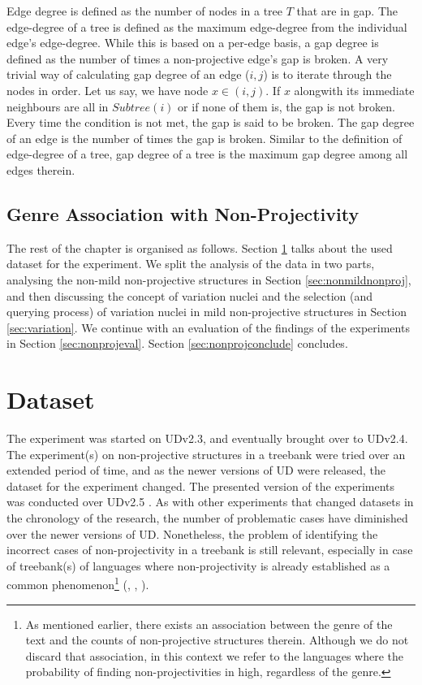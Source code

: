 Edge degree is defined as the number of nodes in a tree \(T\) that are in gap. The edge-degree of a tree is defined as the maximum edge-degree from the individual edge's edge-degree. While this is based on a per-edge basis, a gap degree is defined as the number of times a non-projective edge's gap is broken. A very trivial way of calculating gap degree of an edge (\(i, j\)) is to iterate through the nodes in order. Let us say, we have node \(x \in (i, j)\). If \(x\) alongwith its immediate neighbours are all in \(Subtree(i)\) or if none of them is, the gap is not broken. Every time the condition is not met, the gap is said to be broken. The gap degree of an edge is the number of times the gap is broken. Similar to the definition of edge-degree of a tree, gap degree of a tree is the maximum gap degree among all edges therein.


\subsection{Genre Association with Non-Projectivity}



The rest of the chapter is organised as follows. Section \ref{sec:nonproj_dataset} talks about the used dataset for the experiment. We split the analysis of the data in two parts, analysing the non-mild non-projective structures in Section \ref{sec:nonmildnonproj}, and then discussing the concept of variation nuclei and the selection (and querying process) of variation nuclei in mild non-projective structures in Section \ref{sec:variation}. We continue with an evaluation of the findings of the experiments in Section \ref{sec:nonprojeval}. Section \ref{sec:nonprojconclude} concludes.

\section{Dataset}
\label{sec:nonproj_dataset}

The experiment was started on UDv2.3, and eventually brought over to UDv2.4. The experiment(s) on non-projective structures in a treebank were tried over an extended period of time, and as the newer versions of UD were released, the dataset for the experiment changed. The presented version of the experiments was conducted over UDv2.5 \citep{UDv2.5}. As with other experiments that changed datasets in the chronology of the research, the number of problematic cases have diminished over the newer versions of UD. Nonetheless, the problem of identifying the incorrect cases of non-projectivity in a treebank is still relevant, especially in case of treebank(s) of languages where non-projectivity is already established as a common phenomenon\footnote{As mentioned earlier, there exists an association between the genre of the text and the counts of non-projective structures therein. Although we do not discard that association, in this context we refer to the languages where the probability of finding non-projectivities in high, regardless of the genre.} (\cite{mambriniNonProj}, \cite{indic-riyaz}, \cite{Havelka}).

